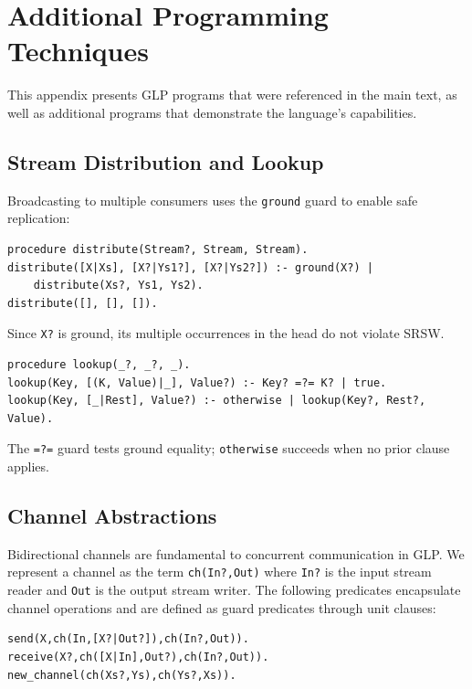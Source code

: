 \section{Additional Programming Techniques}\label{appendix:additional-techniques}

This appendix presents GLP programs that were referenced in the main text, as well as additional programs that demonstrate the language's capabilities.

\subsection{Stream Distribution and Lookup}

\begin{example}
\label{ex:distribute}
Broadcasting to multiple consumers uses the \verb|ground| guard to enable safe replication:
\begin{verbatim}
procedure distribute(Stream?, Stream, Stream).
distribute([X|Xs], [X?|Ys1?], [X?|Ys2?]) :- ground(X?) |
    distribute(Xs?, Ys1, Ys2).
distribute([], [], []).
\end{verbatim}
Since \verb|X?| is ground, its multiple occurrences in the head do not violate SRSW.
\end{example}

\begin{example}
\label{ex:lookup}

\begin{verbatim}
procedure lookup(_?, _?, _).
lookup(Key, [(K, Value)|_], Value?) :- Key? =?= K? | true.
lookup(Key, [_|Rest], Value?) :- otherwise | lookup(Key?, Rest?, Value).
\end{verbatim}
The \verb|=?=| guard tests ground equality; \verb|otherwise| succeeds when no prior clause applies.
\end{example}

\subsection{Channel Abstractions}

Bidirectional channels are fundamental to concurrent communication in GLP. We represent a channel as the term \verb|ch(In?,Out)| where \verb|In?| is the input stream reader and \verb|Out| is the output stream writer. The following predicates encapsulate channel operations and are defined as guard predicates through unit clauses:

\label{program:channel-operations}
\begin{verbatim}
send(X,ch(In,[X?|Out?]),ch(In?,Out)).
receive(X?,ch([X|In],Out?),ch(In?,Out)).
new_channel(ch(Xs?,Ys),ch(Ys?,Xs)).
\end{verbatim}

